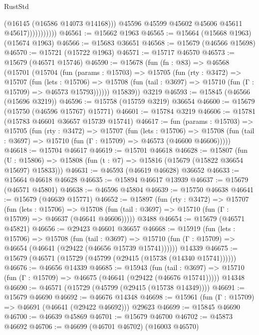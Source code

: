 \begin{lexlean}{RustStd}
\begin{coremodule}
                            (@16145 (@16586 @14073 @14168)))
                          @45596
                          @45599
                          @45602
                          @45606
                          @45611
                          @45617)))))))))))
@46561 := @15662 @1963
@46565 := @15664 (@15668 @1963) (@15674 @1963)
@46566 := @15683 @36651
@46568 := @15679 (@46566 @15698)
@46570 := @15721 (@15722 @1963)
@46571 := @15717 @46570
@46573 := @15679 (@46571 @15746)
@46590 := @15678
    (fun (fn : @83) =>
    @46568
      (@15701
        (@15704
          (fun (params : @15703) =>
          @15705
            (fun (rty : @3472) =>
            @15707
              (fun (lets : @15706) =>
              @15708 (fun (tail : @3697) => @15710 (fun (Γ : @15709) => @46573 @15793))))))
        @15839))
    @3219
@46593 := @15845 (@46566 (@15696 @3219))
@46596 := @15758 (@15759 @3219) @36654
@46600 := @15679 (@15750 (@46596 @15767) @15771)
@46601 := @15784 @3219
@46606 := @15781 (@15783 @46601 @36657 @15739 @15741)
@46617 := fun (params : @15703) =>
  @15705
    (fun (rty : @3472) =>
    @15707
      (fun (lets : @15706) =>
      @15708 (fun (tail : @3697) => @15710 (fun (Γ : @15709) => @46573 (@46600 @46606)))))
@46618 := @15704 @46617
@46619 := @15701 @46618
@46628 := @15807
    (fun (U : @15806) => @15808 (fun (t : @7) => @15816 (@15679 (@15822 @36654 @15697) @15833)))
@46631 := @46593 (@46619 @46628) @36652
@46633 := @15664 @46618 @46628
@46635 := @15894 @46617 @13939
@46637 := @15679 (@46571 @45801)
@46638 := @46596 @45804
@46639 := @15750 @46638
@46641 := @15679 (@46639 @15771)
@46652 := @15897
    (fun (rty : @3472) =>
    @15707
      (fun (lets : @15706) =>
      @15708 (fun (tail : @3697) => @15710 (fun (Γ : @15709) => @46637 (@46641 @46606)))))
    @3488
@46654 := @15679 (@46571 @45821)
@46656 := @29423 @46601 @36657
@46668 := @15919
    (fun (lets : @15706) =>
    @15708
      (fun (tail : @3697) =>
      @15710 (fun (Γ : @15709) => @46654 (@46641 (@29422 (@46656 @15739 @15741))))))
    @14339
@46675 := @15679 (@46571 (@15729 (@45799 (@29415 (@15738 (@14340 @15741))))))
@46676 := @46656 @14339
@46685 := @15943
    (fun (tail : @3697) => @15710 (fun (Γ : @15709) => @46675 (@46641 (@29422 (@46676 @15741)))))
    @14348
@46690 := @46571 (@15729 (@45799 (@29415 (@15738 @14349))))
@46691 := @15679 @46690
@46692 := @46676 @14348
@46698 := @15961 (fun (Γ : @15709) => @46691 (@46641 (@29422 @46692))) @29623
@46699 := @15845 @46690
@46700 := @46639 @45869
@46701 := @15679 @46700
@46702 := @45873 @46692
@46706 := @46699 (@46701 @46702) (@16003 @46570)

\end{coremodule}
\end{lexlean}
